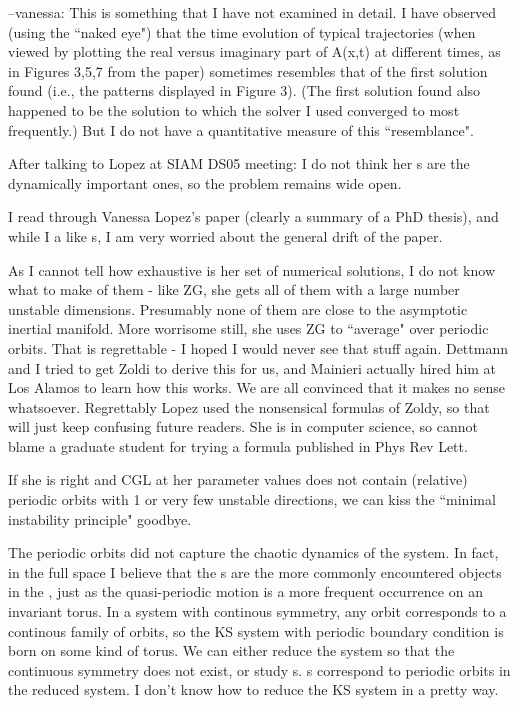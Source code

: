 --vanessa:
This is something that I have not examined in detail.  I have observed (using
the ``naked eye") that the time evolution of typical trajectories (when viewed
by plotting the real versus imaginary part of A(x,t) at different times, as in
Figures 3,5,7 from the paper) sometimes resembles that of the first solution
found (i.e., the patterns displayed in Figure 3). (The first solution
found also happened to be the solution to which the solver I used
converged to most frequently.)  But I do not have a
quantitative measure of this ``resemblance".

After talking to Lopez at SIAM DS05 meeting: I do not think
her \rpo s are the dynamically important ones, so the problem remains wide open.

I read through
Vanessa Lopez's paper (clearly a summary of a PhD thesis), and while I
a like {\rpo s}, I am very worried about the general drift
of the paper.

As I cannot tell how exhaustive is her set of numerical solutions, I do
not know what to make of them - like ZG, she gets all of them with a large
number unstable dimensions. Presumably none of them are close to the
asymptotic inertial manifold. More worrisome still, she uses ZG to
``average" over periodic orbits. That is regrettable - I hoped I would
never see that stuff again. Dettmann and I tried to get Zoldi to
derive this for us, and Mainieri actually hired him at Los Alamos to learn
how this works. We are all convinced that it makes no sense whatsoever.
Regrettably Lopez used the nonsensical formulas of Zoldy, so that will
just keep confusing future readers. 
She is in computer science, so cannot
blame a graduate student for trying a formula published in Phys Rev Lett.


If she is right and CGL at her parameter values does not contain
(relative) periodic orbits with 1 or very few unstable directions, we can
kiss the ``minimal instability principle" goodbye.

The 
periodic orbits
did not capture the chaotic dynamics of the system. In fact, in the full
space I believe that the {\rpo s} are the more commonly
encountered objects in the \statesp, just as the quasi-periodic motion is a
more frequent occurrence on an invariant torus. In a system with continous
symmetry, any orbit corresponds to a continous family of orbits, so the KS
system with periodic boundary condition is born on some kind of torus. We can
either reduce the system so that the continuous symmetry does not exist, or
study {\rpo s}. {\Rpo s} correspond to periodic
orbits in the reduced system. I don't know how to reduce the KS system in a
pretty way.


